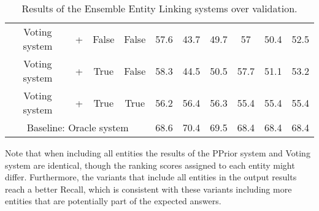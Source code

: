 \begin{table}[h!]
{\begin{tabular}{|c|ccc|ccc|ccc|}
    Voting system                    & +                                                                                                    & False                                                                                                     & False                              & 57.6                                 & 43.7                                    & 49.7              & 57                                   & 50.4                                    & 52.5              \\
    Voting system                    & +                                                                                                    & True                                                                                                      & False                              & 58.3                                 & 44.5                                    & 50.5              & 57.7                                 & 51.1                                    & 53.2              \\
    Voting system                    & +                                                                                                    & True                                                                                                      & True                      & 56.2                        & 56.4                           & 56.3     & 55.4                        & 55.4                           & 55.4     \\ \hline
    \multicolumn{4}{|c|}{Baseline: Oracle system}                                                                                                                                                                                                                                            & 68.6                                 & 70.4                                    & 69.5              & 68.4                                 & 68.4                                    & 68.4              \\ \hline
    \end{tabular}%
    }
    \caption{Results of the Ensemble Entity Linking systems over \LCQuADtwo{} validation.}
    \label{table:eelResultsLcquad2}
\end{table}

Note that when including all entities the results of the PPrior system and Voting system are 
identical, though the ranking scores assigned to each entity might differ. Furthermore, the 
variants that include all entities in the output results reach a better Recall, which is 
consistent with these variants including more entities that are potentially part of the expected 
answers.

